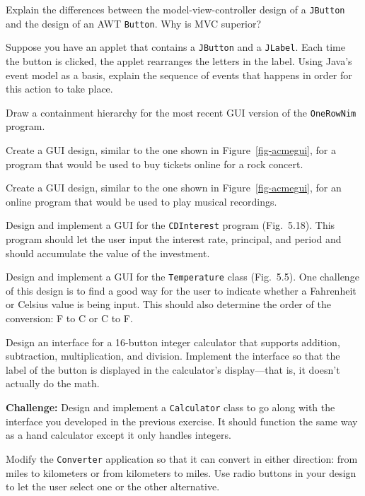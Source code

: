 \begin{EXRtwo}
\item  Explain the differences between the model-view-controller
design of a {\tt JButton} and the design of an AWT {\tt Button}.
Why is MVC superior?

\item  Suppose you have an applet that contains a \mbox{\tt JButton}
and a {\tt JLabel}. Each time the button is clicked, the applet
rearranges the letters in the label. Using Java's event model as a
basis, explain the sequence of events that happens in order for this
action to take place.

\item Draw a containment hierarchy for the most recent GUI version of the
{\tt OneRowNim} program.

\item  Create a GUI design, similar to the one shown in
Figure~\ref{fig-acmegui}, for a program that would be
used to buy tickets online for a rock concert.

\item  Create a GUI design, similar to the one shown in
Figure~\ref{fig-acmegui}, for an online program that
would be used to play musical recordings.

\item  Design and implement a GUI for the {\tt CDInterest}
program (Fig.~5.18). This program should
let the user input the interest rate, principal, and period
and should accumulate the value of the investment.

\item  Design and implement a GUI for the {\tt Temperature}
class (Fig.~5.5). One challenge of
this design is to find a good way for the user to indicate
whether a Fahrenheit or Celsius value is being input. This
should also determine the order of the conversion: F to C
or C to F.

\item  Design an interface for a 16-button integer calculator that supports
addition, subtraction, multiplication, and division. Implement
the interface so that the label of the button is displayed in the
calculator's display---that is, it doesn't actually do the math.

\item  {\bf Challenge: } Design and implement a {\tt Calculator}
class to go along with the interface you developed in the previous
exercise. It should function the same way as a hand calculator except
it only handles integers.

\item  Modify the {\tt Converter} application so that it can convert
in either direction: from miles to kilometers or from kilometers to
miles. Use radio buttons in your design to let the user select one or
the other alternative.


\end{EXRtwo}
